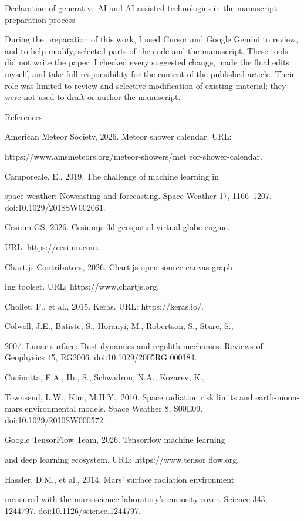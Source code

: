 Declaration of generative AI and AI-assisted technologies in the manuscript preparation process

During the preparation of this work, I used Cursor and Google Gemini to review, and to help modify, selected parts of the code and the manuscript. These tools did not write the paper. I checked every suggested change, made the final edits myself, and take full responsibility for the content of the published article. Their role was limited to review and selective modification of existing material; they were not used to draft or author the manuscript.

References

American Meteor Society, 2026. Meteor shower calendar. URL:

https://www.amsmeteors.org/meteor-showers/met eor-shower-calendar.

Camporeale, E., 2019. The challenge of machine learning in

space weather: Nowcasting and forecasting. Space Weather 17, 1166--1207. doi:10.1029/2018SW002061.

Cesium GS, 2026. Cesiumjs 3d geospatial virtual globe engine.

URL: https://cesium.com.

Chart.js Contributors, 2026. Chart.js open-source canvas graph-

ing toolset. URL: https://www.chartjs.org.

Chollet, F., et al., 2015. Keras. URL: https://keras.io/.

Colwell, J.E., Batiste, S., Horanyi, M., Robertson, S., Sture, S.,

2007. Lunar surface: Dust dynamics and regolith mechanics. Reviews of Geophysics 45, RG2006. doi:10.1029/2005RG 000184.

Cucinotta, F.A., Hu, S., Schwadron, N.A., Kozarev, K.,

Townsend, L.W., Kim, M.H.Y., 2010. Space radiation risk limits and earth-moon-mars environmental models. Space Weather 8, S00E09. doi:10.1029/2010SW000572.

Google TensorFlow Team, 2026. Tensorflow machine learning

and deep learning ecosystem. URL: https://www.tensor flow.org.

Hassler, D.M., et al., 2014. Mars' surface radiation environment

measured with the mars science laboratory's curiosity rover. Science 343, 1244797. doi:10.1126/science.1244797.

